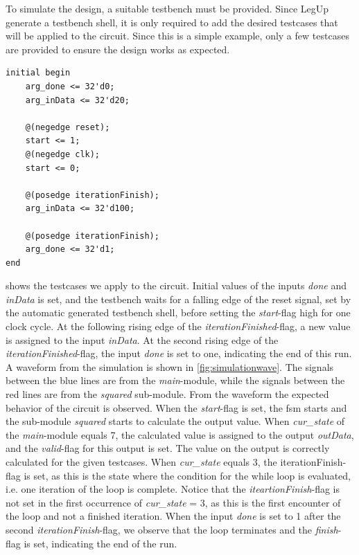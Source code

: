 To simulate the design, a suitable testbench must be provided. Since LegUp generate a testbench shell, it is only required to add the desired testcases that will be applied to the circuit. Since this is a simple example, only a few testcases are provided to ensure the design works as expected. 
\begin{lstlisting}[caption={Testcases for the example testbench},label=lst:tbcases]
initial begin
    arg_done <= 32'd0;
    arg_inData <= 32'd20;
    
    @(negedge reset);
    start <= 1;
    @(negedge clk);
    start <= 0;
    
    @(posedge iterationFinish);
    arg_inData <= 32'd100;
    
    @(posedge iterationFinish);
    arg_done <= 32'd1;
end
\end{lstlisting}
 shows the testcases we apply to the circuit. Initial values of the inputs \textit{done} and \textit{inData} is set, and the testbench waits for a falling edge of the reset signal, set by the automatic generated testbench shell, before setting the \textit{start}-flag high for one clock cycle. At the following rising edge of the \textit{iterationFinished}-flag, a new value is assigned to the input \textit{inData}. At the second rising edge of the \textit{iterationFinished}-flag, the input \textit{done} is set to one, indicating the end of this run. A waveform from the simulation is shown in \cref{fig:simulationwave}. The signals between the blue lines are from the \textit{main}-module, while the signals between the red lines are from the \textit{squared} sub-module. From the waveform the expected behavior of the circuit is observed. When the \textit{start}-flag is set, the \gls{fsm} starts and the sub-module \textit{squared} starts to calculate the output value. When \textit{cur\_state} of the \textit{main}-module equals 7, the calculated value is assigned to the output \textit{outData}, and the \textit{valid}-flag for this output is set. The value on the output is correctly calculated for the given testcases. When \textit{cur\_state} equals 3, the {iterationFinish}-flag is set, as this is the state where the condition for the while loop is evaluated, i.e. one iteration of the loop is complete. Notice that the \textit{iteartionFinish}-flag is not set in the first occurrence of \textit{cur\_state} = 3, as this is the first encounter of the loop and not a finished iteration. When the input \textit{done} is set to 1 after the second \textit{iterationFinish}-flag, we observe that the loop terminates and the \textit{finish}-flag is set, indicating the end of the run.

